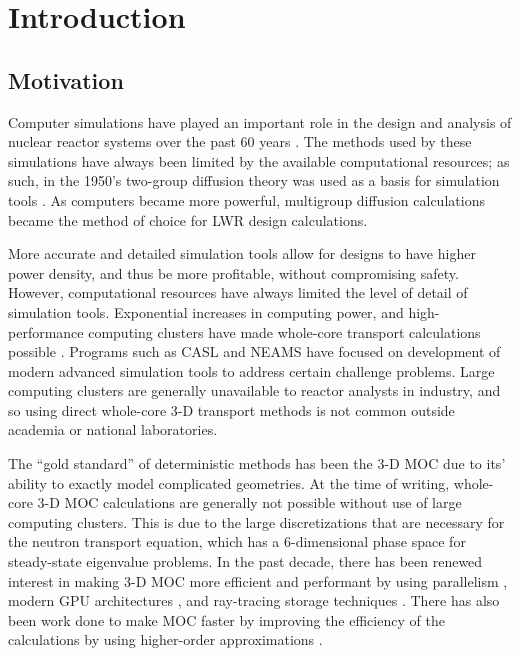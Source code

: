 \chapter{Introduction}{\label{ch:Introduction}
    \section{Motivation}{\label{sec:Introduction:Motivation}
        Computer simulations have played an important role in the design and analysis of nuclear reactor systems over the past 60 years \cite{FewGroupDiffusion}.
        The methods used by these simulations have always been limited by the available computational resources; as such, in the 1950's two-group diffusion theory was used as a basis for simulation tools \cite{FewGroupDiffusion}.
        As computers became more powerful, multigroup diffusion calculations became the method of choice for \ac{LWR} design calculations.

        More accurate and detailed simulation tools allow for designs to have higher power density, and thus be more profitable, without compromising safety.
        However, computational resources have always limited the level of detail of simulation tools.
        Exponential increases in computing power, and high-performance computing clusters have made whole-core transport calculations possible \cite{CASMO-4,Apollo2-2010,DeCART,Denovo,Yang2010,Boyd2014,Collins2016,Gunow2018}.
        Programs such as \ac{CASL} and \ac{NEAMS} have focused on development of modern advanced simulation tools to address certain challenge problems.
        Large computing clusters are generally unavailable to reactor analysts in industry, and so using direct whole-core 3-D transport methods is not common outside academia or national laboratories.

        The ``gold standard'' of deterministic methods has been the 3-D \ac{MOC} \cite{Askew1972} due to its' ability to exactly model complicated geometries.
        At the time of writing, whole-core 3-D \ac{MOC} calculations are generally not possible without use of large computing clusters.
        This is due to the large discretizations that are necessary for the neutron transport equation, which has a 6-dimensional phase space for steady-state eigenvalue problems.
        In the past decade, there has been renewed interest in making 3-D \ac{MOC} more efficient and performant by using parallelism \cite{Kochunas2013}, modern \ac{GPU} architectures \cite{Boyd2014}, and ray-tracing storage techniques \cite{Sciannandrone2016, Gunow2016}.
        There has also been work done to make \ac{MOC} faster by improving the efficiency of the calculations by using higher-order approximations \cite{Ferrer2016,Gunow2018}.

}}
